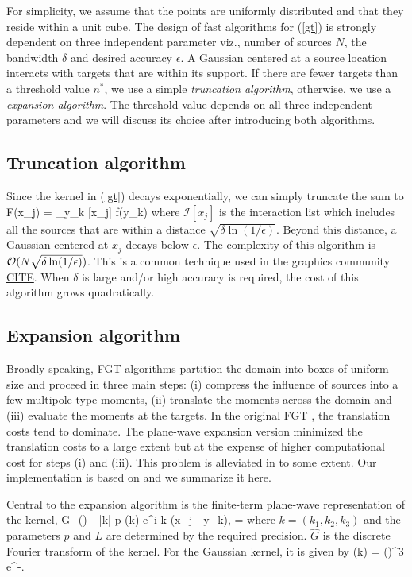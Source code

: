For simplicity, we assume that the points are uniformly distributed and that they reside within a unit cube.
The design of fast algorithms for (\ref{gt}) is strongly dependent on three independent parameter viz., number of sources $N$, the bandwidth $\delta$ and desired accuracy $\epsilon$. A Gaussian centered at a source location interacts with targets that are within its support. If there are fewer targets than a threshold value $n^*$, we use a simple {\em truncation algorithm}, otherwise, we use a {\em expansion algorithm}. The threshold  value depends on all three independent parameters and we will discuss its choice after introducing both algorithms. 

\subsection{Truncation algorithm} 
Since the kernel in (\ref{gt}) decays exponentially, we can simply truncate the sum to
%
\beq F(x_j) = \sum_{y_k \in {}[x_j]}  f(y_k) \eeq
%
where $\mathcal{I}[x_j]$ is the interaction list which includes all the sources that are within a distance $\sqrt{\delta \ln (1/\epsilon)}$. Beyond this distance, a Gaussian centered at $x_j$ decays below $\epsilon$. The complexity of this algorithm is $\mathcal{O}(N \sqrt{\delta \ln(1/\epsilon)})$. This is a common technique used in the graphics community \ul{CITE}. When $\delta$ is large and/or high accuracy is required, the cost of this algorithm grows quadratically.  

\subsection{Expansion algorithm}
Broadly speaking, FGT algorithms partition the domain into boxes of uniform size and proceed in three main steps: (i) compress the influence of sources into a few multipole-type moments, (ii) translate the moments across the domain and (iii) evaluate the moments at the targets. In the original FGT \cite{fgt}, the translation costs tend to dominate\cite{fggt}. The plane-wave expansion version \cite{fggt} minimized the translation costs to a large extent but at the expense of higher computational cost for steps (i) and (iii). This problem is alleviated in \cite{fggt} to some extent. Our implementation is based on \cite{fggt} and we summarize it here. 

Central to the expansion algorithm is the finite-term plane-wave representation of the kernel,
\beq G_\delta() \approx \sum_{|k| \leq p} (k) e^{i \lambda k \cdot (x_j - y_k)}, \quad \lambda = \eeq
where $k = (k_1, k_2, k_3)$ and the parameters $p$ and $L$ are determined by the required precision. $\hat{G}$ is the discrete Fourier transform of the kernel. For the Gaussian kernel, it is given by
\beq {}(k) = \left(\right)^3 e^{-}.\eeq

